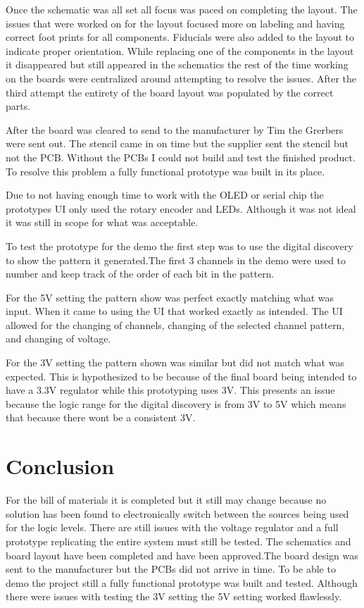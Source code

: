 \documentclass[12pt]{article}
\begin{document}
    \par Once the schematic was all set all focus was paced on completing the layout. The issues that were worked on for the layout focused more on labeling and having correct foot prints for all components. Fiducials were also added to the layout to indicate proper orientation. While replacing one of the components in the layout it disappeared but still appeared in the schematics the rest of the time working on the boards were centralized around attempting to resolve the issues. After the third attempt the entirety of the board layout was populated by the correct parts.  
    \par After the board was cleared to send to the manufacturer by Tim the Grerbers were sent out. The stencil came in on time but the supplier sent the stencil but not the PCB. Without the PCBs I could not build and test the finished product. To resolve this problem a fully functional prototype was built in its place.
    \par Due to not having enough time to work with the OLED or serial chip the prototypes UI only used the rotary encoder and LEDs. Although it was not ideal it was still in scope for what was acceptable.
    \par To test the prototype for the demo the first step was to use the digital discovery to show the pattern it generated.The first 3 channels in the demo were used to number and keep track of the order of each bit in the pattern.
    \par For the 5V setting the pattern show was perfect exactly matching what was input. When it came to using the UI that worked exactly as intended. The UI allowed for the changing of channels, changing of the selected channel pattern, and changing of voltage.
    \par For the 3V setting the pattern shown was similar but did not match what was expected. This is hypothesized to be because of the final board being intended to have a 3.3V regulator while this prototyping uses 3V. This presents an issue because the logic range for the digital discovery is from 3V to 5V which means that because there wont be a consistent 3V.

    \section{Conclusion}
    For the bill of materials it is completed but it still may change because no solution has been found to electronically switch between the sources being used for the logic levels. There are still issues with the voltage regulator and a full prototype replicating the entire system must still be tested. The schematics and board layout have been completed and have been approved.The board design was sent to the manufacturer but the PCBs did not arrive in time. To be able to demo the project still a fully functional prototype was built and tested. Although there were issues with testing the 3V setting the 5V setting worked flawlessly.
\end{document}
